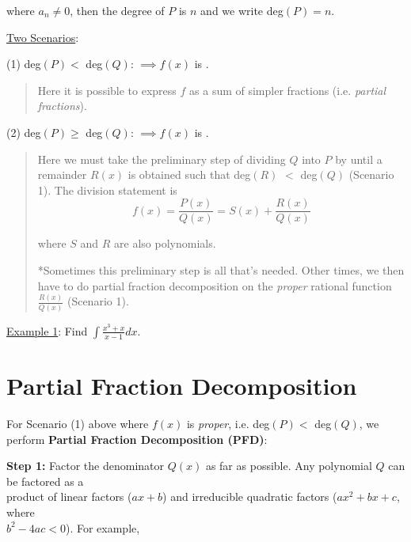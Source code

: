 \documentclass[paper=a4, fontsize=11pt]{scrartcl} %
\numberwithin{equation}{section} %
\numberwithin{figure}{section} %
\numberwithin{table}{section} %
\newcommand{\ds}{\displaystyle}
\begin{document}
where $a_n\neq 0$, then the degree of $P$ is $n$ and we write deg$(P)=n$.\\
\indent

\underline{Two Scenarios}:\\
\indent

(1) deg$(P)<$ deg$(Q)$: \quad $\implies f(x)$ is \underline{\hspace{1.25in}}. \\
\begin{quote}
\flushleft
 Here it is possible to express $f$ as a sum of simpler fractions (i.e. \textit{partial fractions}).\\
\indent
\end{quote}

(2) deg$(P)\geq$ deg$(Q)$: \quad $\implies f(x)$ is \underline{\hspace{1.25in}}.\\
\begin{quote}
\flushleft
Here we must take the preliminary step of dividing $Q$ into $P$ by \underline{\hspace{1in}} \underline{\hspace{1.25in}} until a remainder $R(x)$ is obtained such that deg$(R)$ $<$ deg$(Q)$ (Scenario 1). The division statement is
\[f(x) = \ds\frac{P(x)}{Q(x)} = S(x) + \ds\frac{R(x)}{Q(x)}\]

where $S$ and $R$ are also polynomials. \\
\indent

*Sometimes this preliminary step is all that's needed. Other times, we then have to do partial fraction decomposition on the \textit{proper} rational function $\ds\frac{R(x)}{Q(x)}$ (Scenario 1).\\
\indent
\end{quote}

\underline{Example 1}: Find $\ds\int \ds\frac{x^3 + x}{x-1}dx$.\\
\indent

\vspace{3in}

\section*{Partial Fraction Decomposition}

For Scenario (1) above where $f(x)$ is \textit{proper}, i.e. deg$(P)<$ deg$(Q)$, we perform \textbf{Partial Fraction Decomposition (PFD)}:\\
\indent

\textbf{Step 1:} Factor the denominator $Q(x)$ as far as possible. Any polynomial $Q$ can be factored as a\\
\hspace{43pt} product of linear factors ($ax+b$) and irreducible quadratic factors ($ax^2 + bx + c$, where\\
\hspace{43pt} $b^2-4ac<0$). For example,\\
\end{document}
